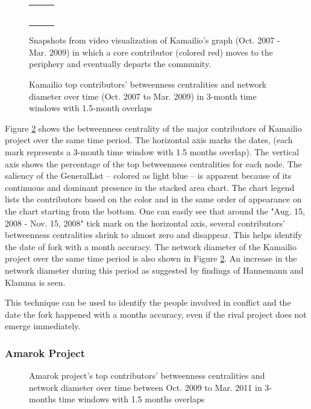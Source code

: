 \documentclass{acm_proc_article-sp}
\begin{document}
\begin{figure}[!ht]
\begin{tabularx}{\linewidth}{@{}cXX@{}}
\begin{tabular}{cccc}
\end{tabular} 
\end{tabularx} 
\caption{Snapshots from video visualization of Kamailio's graph (Oct. 2007 - Mar. 2009) in which a core contributor (colored red) moves to the periphery and eventually departs the community.} 
\label{figureKamailioGraph} 
\end{figure} 

\begin{figure}[!ht]
\centering
{}
\justifying
{}
\caption{Kamailio top contributors' betweenness centralities and network diameter over time (Oct. 2007 to Mar. 2009) in 3-month time windows with 1.5-month overlaps}
\label{figureKamailioStackedAreaChart}
\end{figure}

Figure \ref{figureKamailioStackedAreaChart} shows the betweenness centrality of the major contributors of Kamailio project over the same time period. The horizontal axis marks the dates, (each mark represents a 3-month time window with 1.5 months overlap). The vertical axis shows the percentage of the top betweenness centralities for each node. The saliency of the GeneralList -- colored as light blue -- is apparent because of its continuous and dominant presence in the stacked area chart. The chart legend lists the contributors based on the color and in the same order of appearance on the chart starting from the bottom. One can easily see that around the "Aug. 15, 2008 - Nov. 15, 2008" tick mark on the horizontal axis, several contributors' betweenness centralities shrink to almost zero and disappear. This helps identify the date of fork with a month accuracy. The network diameter of the Kamailio project over the same time period is also shown in Figure \ref{figureKamailioStackedAreaChart}. An increase in the network diameter during this period as suggested by findings of Hannemann and Klamma \cite{Hannemann} is seen.

This technique can be used to identify the people involved in conflict and the date the fork happened with a months accuracy, even if the rival project does not emerge immediately.

\subsubsection{Amarok Project}
\begin{figure}[!Ht]
\centering
{}
\justifying
{}
\caption{Amarok project's top contributors' betweenness centralities and network diameter over time between Oct. 2009 to Mar. 2011 in 3-months time windows with 1.5 months overlaps}
\label{figureAmarokStachedAreaChart}
\end{figure}
\end{document}
